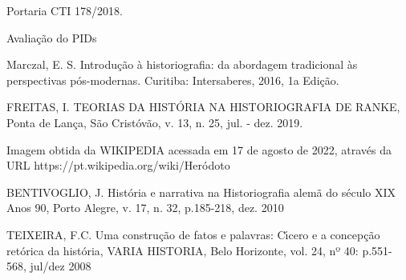 \documentclass[
12pt,		%
openright,	%
twoside,  %
a4paper,			%
chapter=TITLE,		%
english,			%
french,				%
spanish,			%
brazil				%
]{USPSC-classe/USPSC}
\begin{document}
\begin{flushleft}
\begin{flushleft}
[CTI, 2018] Portaria CTI 178/2018.
\end{flushleft}


\end{flushleft}


\begin{flushleft}
\begin{flushleft}
[MAMMANA, 2009] Avalia\c{c}\~ao do PIDs
\end{flushleft}


\end{flushleft}


\begin{flushleft}
\begin{flushleft}
[Marczal, 2016] Marczal, E. S. Introdu\c{c}\~ao \`a historiografia: da abordagem tradicional \`as perspectivas p\'os-modernas. Curitiba: Intersaberes, 2016, 1a Edi\c{c}\~ao.
\end{flushleft}


\end{flushleft}


\begin{flushleft}
\begin{flushleft}
[FREITAS, 2019] FREITAS, I. TEORIAS DA HIST\'ORIA NA HISTORIOGRAFIA DE RANKE, Ponta de Lan\c{c}a, S\~ao Crist\'ov\~ao, v. 13, n. 25, jul. - dez. 2019.
\end{flushleft}


\end{flushleft}


\begin{flushleft}
\begin{flushleft}
[WIKIPEDIA, 2022] Imagem obtida da WIKIPEDIA acessada em 17 de agosto de 2022, atrav\'es da URL https://pt.wikipedia.org/wiki/Her\'odoto
\end{flushleft}


\end{flushleft}


\begin{flushleft}
\begin{flushleft}
[BENTIVOGLIO, 2010] BENTIVOGLIO, J. Hist\'oria e narrativa na Historiografia alem\~a do s\'eculo XIX Anos 90, Porto Alegre, v. 17, n. 32, p.185-218, dez. 2010
\end{flushleft}


\end{flushleft}


\begin{flushleft}
\begin{flushleft}
[TEIXEIRA, 2008] TEIXEIRA, F.C. Uma constru\c{c}\~ao de fatos e palavras: C\'{\i}cero e a concep\c{c}\~ao ret\'orica da hist\'oria, VARIA HISTORIA, Belo Horizonte, vol. 24, nº 40: p.551-568, jul/dez 2008
\end{flushleft}


\end{flushleft}
\end{document}
